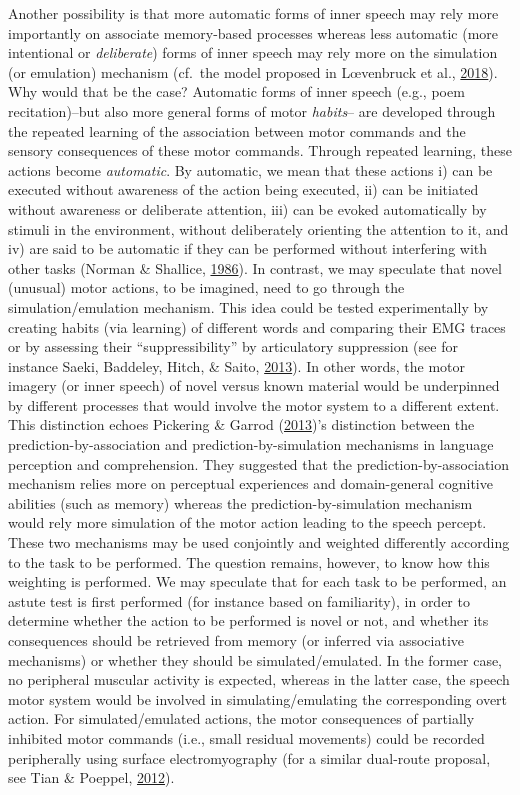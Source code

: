 \documentclass[a4paper,12pt,twoside,openright,oldfontcommands,final]{memoir}
\begin{document}
Another possibility is that more automatic forms of inner speech may rely more importantly on associate memory-based processes whereas less automatic (more intentional or \emph{deliberate}) forms of inner speech may rely more on the simulation (or emulation) mechanism (cf.~the model proposed in Lœvenbruck et al., \protect\hyperlink{ref-loevenbruck_cognitive_2018}{2018}). Why would that be the case? Automatic forms of inner speech (e.g., poem recitation)--but also more general forms of motor \emph{habits}-- are developed through the repeated learning of the association between motor commands and the sensory consequences of these motor commands. Through repeated learning, these actions become \emph{automatic}. By automatic, we mean that these actions i) can be executed without awareness of the action being executed, ii) can be initiated without awareness or deliberate attention, iii) can be evoked automatically by stimuli in the environment, without deliberately orienting the attention to it, and iv) are said to be automatic if they can be performed without interfering with other tasks (Norman \& Shallice, \protect\hyperlink{ref-norman_attention_1986}{1986}). In contrast, we may speculate that novel (unusual) motor actions, to be imagined, need to go through the simulation/emulation mechanism. This idea could be tested experimentally by creating habits (via learning) of different words and comparing their EMG traces or by assessing their \enquote{suppressibility} by articulatory suppression (see for instance Saeki, Baddeley, Hitch, \& Saito, \protect\hyperlink{ref-saeki_breaking_2013}{2013}). In other words, the motor imagery (or inner speech) of novel versus known material would be underpinned by different processes that would involve the motor system to a different extent. This distinction echoes Pickering \& Garrod (\protect\hyperlink{ref-pickering_integrated_2013}{2013})'s distinction between the prediction-by-association and prediction-by-simulation mechanisms in language perception and comprehension. They suggested that the prediction-by-association mechanism relies more on perceptual experiences and domain-general cognitive abilities (such as memory) whereas the prediction-by-simulation mechanism would rely more simulation of the motor action leading to the speech percept. These two mechanisms may be used conjointly and weighted differently according to the task to be performed. The question remains, however, to know how this weighting is performed. We may speculate that for each task to be performed, an astute test is first performed (for instance based on familiarity), in order to determine whether the action to be performed is novel or not, and whether its consequences should be retrieved from memory (or inferred via associative mechanisms) or whether they should be simulated/emulated. In the former case, no peripheral muscular activity is expected, whereas in the latter case, the speech motor system would be involved in simulating/emulating the corresponding overt action. For simulated/emulated actions, the motor consequences of partially inhibited motor commands (i.e., small residual movements) could be recorded peripherally using surface electromyography (for a similar dual-route proposal, see Tian \& Poeppel, \protect\hyperlink{ref-tian_mental_2012}{2012}).
\end{document}
